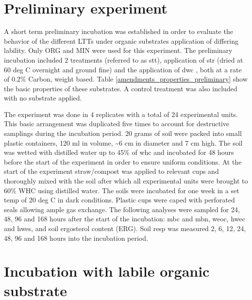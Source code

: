 \section{Preliminary experiment}

	A short term preliminary incubation was established in order to evaluate the behavior of the different LTTs under organic substrates application of differing lability.  Only ORG and MIN were used for this experiment.  The preliminary incubation included 2 treatments (referred to as \gls{stt}), application of \gls{str} (dried at 60 deg C overnight and ground fine) and the application of \gls{dwc} , both at a rate of 0.2\% Carbon, weight based. Table \ref{amendments_properties_preliminary} show the basic properties of these substrates. A control treatment was also included with no substrate applied.

		

	\noindent The experiment was done in 4 replicates with a total of 24 experimental units. This basic arrangement was duplicated five times to account for destructive samplings during the incubation period. 20 grams of soil were packed into small plastic containers, 120 ml in volume, \~{}6 cm in diameter and 7 cm high. The soil was wetted with distilled water up to 45\% of \gls{whc} and incubated for 48 hours before the start of the experiment in order to ensure uniform conditions. At the start of the experiment straw/compost was applied to relevant cups and thoroughly mixed with the soil after which all experimental units were brought to 60\% WHC using distilled water. The soils were incubated for one week in a set temp of 20 deg C in dark conditions. Plastic cups were caped with perforated seals allowing ample gas exchange. The following analyses were sampled for 24, 48, 96 and 168 hours after the start of the incubation: \gls{mbc} and \gls{mbn}, \gls{weoc}, \gls{hwec} and \gls{hwes},  and soil ergosterol content (ERG). Soil \gls{resp} was measured 2, 6, 12, 24, 48, 96 and 168 hours into the incubation period.


\section{Incubation with labile organic substrate}

